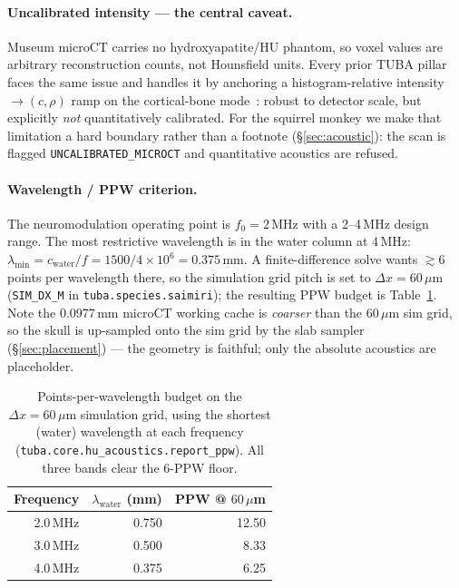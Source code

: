 \documentclass{compactarticle}
\providecommand{\br}{\toprule}
\providecommand{\mr}{\midrule}
\begin{document}
\paragraph{Uncalibrated intensity --- the central caveat.}
Museum microCT carries no hydroxyapatite/HU phantom, so voxel values
are arbitrary reconstruction counts, not Hounsfield units. Every prior
TUBA pillar faces the same issue and handles it by anchoring a
histogram-relative intensity$\to(c,\rho)$ ramp on the cortical-bone
mode~\cite{tuba-mouse,tuba-macaque}: robust to detector scale, but
explicitly \emph{not} quantitatively calibrated. For the squirrel
monkey we make that limitation a hard boundary rather than a footnote
(\S\ref{sec:acoustic}): the scan is flagged
\texttt{UNCALIBRATED\_MICROCT} and quantitative acoustics are refused.

\paragraph{Wavelength / PPW criterion.}
The neuromodulation operating point is $f_0 = 2$\,MHz with a 2--4\,MHz
design range. The most restrictive wavelength is in the water column
at 4\,MHz: $\lambda_{\min} = c_{\text{water}}/f = 1500/4\times10^{6} =
0.375$\,mm. A finite-difference solve wants $\gtrsim 6$ points per
wavelength there, so the simulation grid pitch is set to
$\Delta x = 60\,\mu$m (\texttt{SIM\_DX\_M} in
\texttt{tuba.species.saimiri}); the resulting PPW budget is
Table~\ref{tab:ppw}. Note the 0.0977\,mm microCT working cache is
\emph{coarser} than the $60\,\mu$m sim grid, so the skull is up-sampled
onto the sim grid by the slab sampler (\S\ref{sec:placement}) --- the
geometry is faithful; only the absolute acoustics are placeholder.

\begin{table}[H]
\centering
\caption{Points-per-wavelength budget on the $\Delta x = 60\,\mu$m
         simulation grid, using the shortest (water) wavelength at each
         frequency (\texttt{tuba.core.hu\_acoustics.report\_ppw}). All
         three bands clear the 6-PPW floor.}
\label{tab:ppw}
\small
\begin{tabular}{rrr}
\br
Frequency & $\lambda_{\text{water}}$ (mm) & PPW @ $60\,\mu$m \\
\mr
2.0\,MHz & 0.750 & 12.50 \\
3.0\,MHz & 0.500 & 8.33 \\
4.0\,MHz & 0.375 & 6.25 \\
\mr
\end{tabular}
\end{table}
\end{document}
